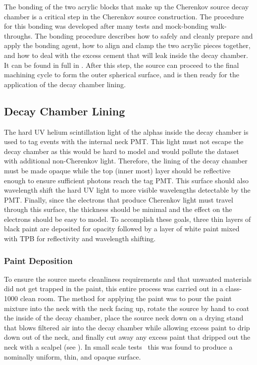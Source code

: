 The bonding of the two acrylic blocks that make up the Cherenkov source decay chamber is a critical step in the Cherenkov source construction. 
The procedure for this bonding was developed after many tests and mock-bonding walk-throughs. 
The bonding procedure describes how to safely and cleanly prepare and apply the bonding agent, how to align and clamp the two acrylic pieces together, and how to deal with the excess cement that will leak inside the decay chamber.
It can be found in full in .
After this step, the source can proceed to the final machining cycle to form the outer spherical surface, and is then ready for the application of the decay chamber lining.

\subsection{Decay Chamber Lining}
\label{sec:lining}

The hard UV helium scintillation light of the alphas inside the decay chamber is used to tag events with the internal neck PMT. 
This light must not escape the decay chamber as this would be hard to model and would pollute the dataset with additional non-Cherenkov light. 
Therefore, the lining of the decay chamber must be made opaque while the top (inner most) layer should be reflective enough to ensure sufficient photons reach the tag PMT. 
This surface should also wavelength shift the hard UV light to more visible wavelengths detectable by the PMT.
Finally, since the electrons that produce Cherenkov light must travel through this surface, the thickness should be minimal and the effect on the electrons should be easy to model. 
To accomplish these goals, three thin layers of black paint are deposited for opacity followed by a layer of white paint mixed with TPB for reflectivity and wavelength shifting. 


\subsubsection{Paint Deposition}

To ensure the source meets cleanliness requirements and that unwanted materials did not get trapped in the paint, this entire process was carried out in a class-1000 clean room.
The method for applying the paint was to pour the paint mixture into the neck with the neck facing up, rotate the source by hand to coat the inside of the decay chamber, place the source neck down on a drying stand that blows filtered air into the decay chamber while allowing excess paint to drip down out of the neck, and finally cut away any excess paint that dripped out the neck with a scalpel (see ). 
In small scale tests~\cite{tanner:2014} this was found to produce a nominally uniform, thin, and opaque surface.


